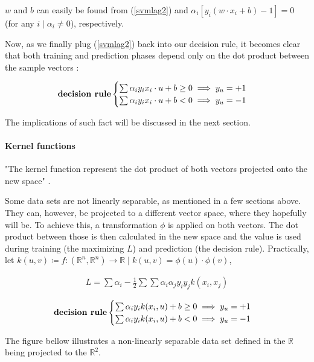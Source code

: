 \documentclass[12pt]{article}
\begin{document}
$w$ and $b$ can easily be found from (\ref{svmlag2}) and $\alpha_i[y_i(w \cdot x_i + b) - 1] = 0$ (for any $i \mid \alpha_i \ne 0$), respectively.

Now, as we finally plug (\ref{svmlag2}) back into our decision rule, it becomes clear that both training and prediction phases depend only on the dot product between the sample vectors \cite{mitsvm}:

$$\text{\textbf{decision rule}} \begin{cases}
	\sum\alpha_i y_i x_i \cdot u +b \geq 0 \implies y_u=+1\\
	\sum\alpha_i y_i x_i \cdot u +b < 0 \implies y_u=-1\\
\end{cases}$$

The implications of such fact will be discussed in the next section.

\paragraph{Kernel functions}

"The kernel function represent the dot product of both vectors projected onto the new space" \cite{mitsvm}.

Some data sets are not linearly separable, as mentioned in a few sections above. They can, however, be projected to a different vector space, where they hopefully will be. To achieve this, a transformation $\phi$ is applied on both vectors. The dot product between those is then calculated in the new space and the value is used during training (the maximizing $L$) and prediction (the decision rule). Practically, let $k(u, v) \coloneqq f: (\mathbb{R}^n, \mathbb{R}^n) \rightarrow \mathbb{R} \mid k(u, v) = \phi(u) \cdot \phi(v)$,

\begin{gather*}
L = \sum\alpha_i -\frac{1}{2}\sum\sum\alpha_i\alpha_j y_i y_j k(x_i, x_j)
\end{gather*}

$$\text{\textbf{decision rule}} \begin{cases}
\sum\alpha_i y_i k(x_i, u) +b \geq 0 \implies y_u=+1\\
\sum\alpha_i y_i k(x_i, u) +b < 0 \implies y_u=-1\\
\end{cases}$$

The figure bellow illustrates a non-linearly separable data set defined in the $\mathbb{R}$ being projected to the $\mathbb{R}^2$.
\end{document}
